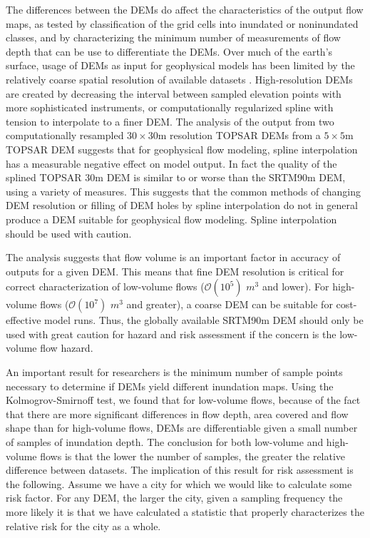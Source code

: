 \documentclass[12pt,letterpaper]{article}
\begin{document}
The differences between the DEMs do affect the characteristics of the
output flow maps, as tested by classification of the grid cells into
inundated or noninundated classes, and by characterizing the minimum
number of measurements of flow depth that can be use to differentiate
the DEMs.  Over much of the earth's surface, usage of DEMs as input
for geophysical models has been limited by the relatively coarse
spatial resolution of available datasets
\citep{Zhang2008}. High-resolution DEMs are created by decreasing the
interval between sampled elevation points with more sophisticated
instruments, or computationally regularized spline with tension to
interpolate to a finer DEM. The analysis of the output from two
computationally resampled $30 \times 30$m resolution TOPSAR DEMs from
a $5 \times 5$m TOPSAR DEM suggests that for geophysical flow
modeling, spline interpolation has a measurable negative effect on
model output.  In fact the quality of the splined TOPSAR 30m DEM is
similar to or worse than the SRTM90m DEM, using a variety of
measures. This suggests that the common methods of changing DEM
resolution or filling of DEM holes by spline interpolation do not in
general produce a DEM suitable for geophysical flow modeling.  Spline
interpolation should be used with caution.

The analysis suggests that flow volume is an important factor in
accuracy of outputs for a given DEM.  This means that fine DEM
resolution is critical for correct characterization of low-volume
flows ($\mathcal{O}(10^5)$ $m^3$ and lower). For high-volume flows ($\mathcal{O}(10^7)$
$m^3$ and greater), a coarse DEM can be suitable for cost-effective
model runs.  Thus, the globally available SRTM90m DEM should only be
used with great caution for hazard and risk assessment if the concern
is the low-volume flow hazard.

An important result for researchers is the minimum number of sample
points necessary to determine if DEMs yield different inundation
maps. Using the Kolmogrov-Smirnoff test, we found that for low-volume
flows, because of the fact that there are more significant differences
in flow depth, area covered and flow shape than for high-volume flows,
DEMs are differentiable given a small number of samples of inundation
depth. The conclusion for both low-volume and high-volume flows is
that the lower the number of samples, the greater the relative
difference between datasets.  The implication of this result for risk
assessment is the following.  Assume we have a city for which we would
like to calculate some risk factor.  For any DEM, the larger the city,
given a sampling frequency the more likely it is that we have
calculated a statistic that properly characterizes the relative risk
for the city as a whole.
\end{document}
